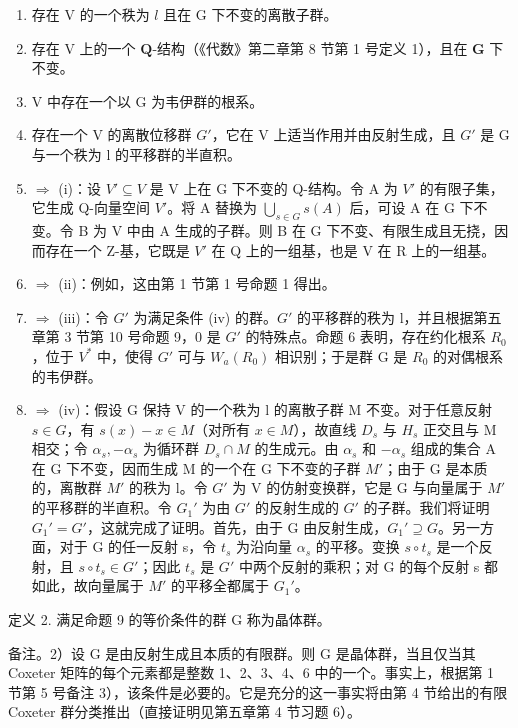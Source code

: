 \begin{enumerate}
\def\labelenumi{(\roman{enumi})}
\item
  存在 \(\mathrm{V}\) 的一个秩为 \(l\) 且在 \(\mathrm{G}\) 下不变的离散子群。
\item
  存在 V 上的一个 \(\mathbf{Q}\)-结构（《代数》第二章第 8 节第 1 号定义 1），且在 \(\mathbf{G}\) 下不变。
\item
  V 中存在一个以 G 为韦伊群的根系。
\item
  存在一个 V 的离散位移群 \(G'\)，它在 V 上适当作用并由反射生成，且 \(G'\) 是 G 与一个秩为 l 的平移群的半直积。
\item
  \(\Longrightarrow\) (i)：设 \(V' \subseteq V\) 是 V 上在 G 下不变的 Q-结构。令 A 为 \(V'\) 的有限子集，它生成 Q-向量空间 \(V'\)。将 A 替换为 \(\bigcup_{s \in G} s(A)\) 后，可设 A 在 G 下不变。令 B 为 V 中由 A 生成的子群。则 B 在 G 下不变、有限生成且无挠，因而存在一个 Z-基，它既是 \(V'\) 在 Q 上的一组基，也是 V 在 R 上的一组基。
\item
  \(\Longrightarrow\) (ii)：例如，这由第 1 节第 1 号命题 1 得出。
\item
  \(\Longrightarrow\) (iii)：令 \(G'\) 为满足条件 (iv) 的群。\(G'\) 的平移群的秩为 l，并且根据第五章第 3 节第 10 号命题 9，0 是 \(G'\) 的特殊点。命题 6 表明，存在约化根系 \(R_{0}\)，位于 \(V^{*}\) 中，使得 \(G'\) 可与 \(W_{a}(R_{0})\) 相识别；于是群 G 是 \(R_{0}\) 的对偶根系的韦伊群。
\item
  \(\Longrightarrow\) (iv)：假设 G 保持 V 的一个秩为 l 的离散子群 M 不变。对于任意反射 \(s \in G\)，有 \(s(x) - x \in M\)（对所有 \(x \in M\)），故直线 \(D_{s}\) 与 \(H_{s}\) 正交且与 M 相交；令 \(\alpha_{s}, -\alpha_{s}\) 为循环群 \(D_{s} \cap M\) 的生成元。由 \(\alpha_{s}\) 和 \(-\alpha_{s}\) 组成的集合 A 在 G 下不变，因而生成 M 的一个在 G 下不变的子群 \(M'\)；由于 G 是本质的，离散群 \(M'\) 的秩为 l。令 \(G'\) 为 V 的仿射变换群，它是 G 与向量属于 \(M'\) 的平移群的半直积。令 \(G_{1}'\) 为由 \(G'\) 的反射生成的 \(G'\) 的子群。我们将证明 \(G_{1}' = G'\)，这就完成了证明。首先，由于 G 由反射生成，\(G_{1}' \supseteq G\)。另一方面，对于 G 的任一反射 s，令 \(t_{s}\) 为沿向量 \(\alpha_{s}\) 的平移。变换 \(s \circ t_{s}\) 是一个反射，且 \(s \circ t_{s} \in G'\)；因此 \(t_{s}\) 是 \(G'\) 中两个反射的乘积；对 G 的每个反射 s 都如此，故向量属于 \(M'\) 的平移全都属于 \(G_{1}'\)。
\end{enumerate}

定义 2. 满足命题 9 的等价条件的群 G 称为晶体群。

备注。2）设 G 是由反射生成且本质的有限群。则 G 是晶体群，当且仅当其 Coxeter 矩阵的每个元素都是整数 1、2、3、4、6 中的一个。事实上，根据第 1 节第 5 号备注 3），该条件是必要的。它是充分的这一事实将由第 4 节给出的有限 Coxeter 群分类推出（直接证明见第五章第 4 节习题 6）。

